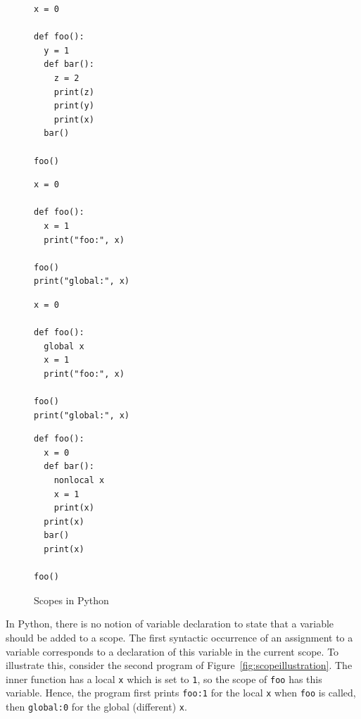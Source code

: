 \documentclass[submission,copyright,creativecommons]{eptcs}
\begin{document}
\begin{figure}
  \centering
  \begin{minipage}[t]{0.2\textwidth}
    \begin{verbatim}
x = 0

def foo():
  y = 1
  def bar():
    z = 2
    print(z)
    print(y)
    print(x)
  bar()

foo()
    \end{verbatim}
  \end{minipage}
  \begin{minipage}[t]{0.26\textwidth}
    \begin{verbatim}
x = 0

def foo():
  x = 1
  print("foo:", x)

foo()
print("global:", x)
    \end{verbatim}
  \end{minipage}
  \begin{minipage}[t]{0.24\textwidth}
    \begin{verbatim}
x = 0

def foo():
  global x
  x = 1
  print("foo:", x)

foo()
print("global:", x)
    \end{verbatim}
  \end{minipage}
  \begin{minipage}[t]{0.24\textwidth}
    \begin{verbatim}
def foo():
  x = 0
  def bar():
    nonlocal x
    x = 1
    print(x)
  print(x)
  bar()
  print(x)

foo()
    \end{verbatim}
  \end{minipage}
  \caption{Scopes in Python}\label{fig:scopeillustration}
\end{figure}

In Python, there is no notion of variable declaration to state that a variable
should be added to a scope. The first
syntactic occurrence of an assignment to a variable corresponds to a declaration
of this variable in the current scope. To illustrate this,
consider the second program of Figure~\vref{fig:scopeillustration}. The inner
function has a local \texttt{x} which is set to \texttt{1}, so the scope of
\texttt{foo} has this variable. Hence, the program first
prints \texttt{foo:1} for the local \texttt{x} when \texttt{foo} is called, then \texttt{global:0} for the
global (different) \texttt{x}.
\end{document}
